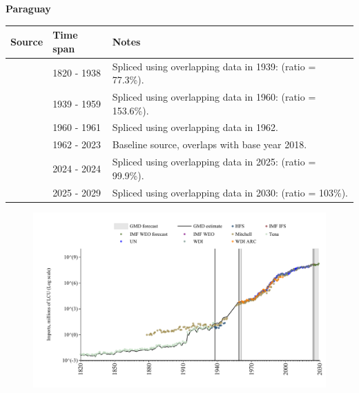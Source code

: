 \documentclass[12pt,a4paper,landscape]{article}
\begin{document}
\begin{adjustbox}{max totalsize={\paperwidth}{\paperheight},center}
\begin{minipage}[t][\textheight][t]{\textwidth}
\vspace*{0.5cm}
{}
\begin{center}
{\Large\bfseries Paraguay}
\end{center}
\vspace{0.5cm}
\begin{table}[H]
\centering
\small
\begin{tabular}{|l|l|l|}
\hline
\textbf{Source} & \textbf{Time span} & \textbf{Notes} \\
\hline
\rowcolor{white}\cite{Tena}& 1820 - 1938 &Spliced using overlapping data in 1939: (ratio = 77.3\%).\\
\rowcolor{lightgray}\cite{Mitchell}& 1939 - 1959 &Spliced using overlapping data in 1960: (ratio = 153.6\%).\\
\rowcolor{white}\cite{WDI_ARC}& 1960 - 1961 &Spliced using overlapping data in 1962.\\
\rowcolor{lightgray}\cite{WDI}& 1962 - 2023 &Baseline source, overlaps with base year 2018.\\
\rowcolor{white}\cite{IMF_IFS}& 2024 - 2024 &Spliced using overlapping data in 2025: (ratio = 99.9\%).\\
\rowcolor{lightgray}\cite{IMF_WEO_forecast}& 2025 - 2029 &Spliced using overlapping data in 2030: (ratio = 103\%).\\
\hline
\end{tabular}
\end{table}
\begin{figure}[H]
\centering
\includegraphics[width=\textwidth,height=0.6\textheight,keepaspectratio]{graphs/PRY_imports.pdf}
\end{figure}
\end{minipage}
\end{adjustbox}
\end{document}
